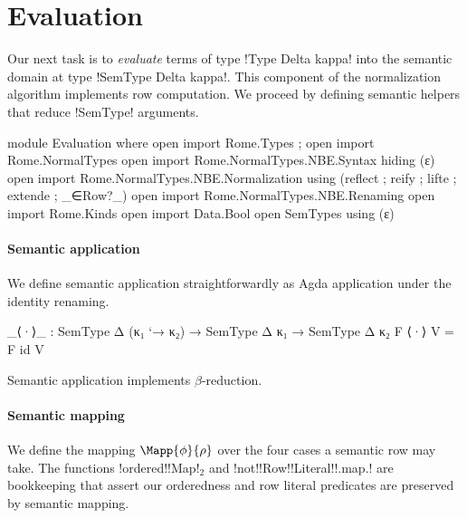 
\section{Evaluation}
\label{sec:Evaluation}
Our next task is to \emph{evaluate} terms of type !Type Delta kappa! into the semantic domain at type !SemType Delta kappa!. This component of the normalization algorithm implements row computation. We proceed by defining semantic helpers that reduce !SemType! arguments.

\begin{code}[hide]
module Evaluation where
  open import Rome.Types ; open import Rome.NormalTypes
  open import Rome.NormalTypes.NBE.Syntax hiding (ε)
  open import Rome.NormalTypes.NBE.Normalization using (reflect ; reify ; lifte ; extende ; _∈Row?_)
  open import Rome.NormalTypes.NBE.Renaming
  open import Rome.Kinds
  open import Data.Bool
  open SemTypes using (ε)
\end{code}

\paragraph{Semantic application}

We define semantic application straightforwardly as Agda application under the identity renaming.

\begin{code}
  _⟨·⟩_ : SemType Δ (κ₁ `→ κ₂) → SemType Δ κ₁ → 
         SemType Δ κ₂
  F ⟨·⟩ V = F id V
\end{code}


\Ni Semantic application implements $\beta$-reduction. 

\paragraph{Semantic mapping}
We define the mapping $\Mapp {\phi} {\rho}$ over the four cases a semantic row may take. The functions !ordered!!Map!$_{2}$ and !not!!Row!!Literal!!.map.! are bookkeeping that assert our orderedness and row literal predicates are preserved by semantic mapping.

